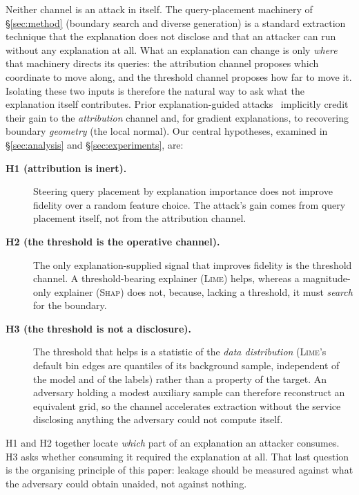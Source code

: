 \documentclass[sigconf,anonymous,review]{acmart}
\begin{document}
Neither channel is an attack in itself. The query-placement machinery of \S\ref{sec:method} (boundary search and diverse generation) is a standard extraction technique that the explanation does not
disclose and that an attacker can run without any explanation at all. What an explanation can change is
only \emph{where} that machinery directs its queries: the attribution channel proposes which coordinate
to move along, and the threshold channel proposes how far to move it. Isolating these two inputs is
therefore the natural way to ask what the explanation itself contributes. Prior explanation-guided
attacks~\cite{oksuz2024autolycus,milli2019model} implicitly credit their gain to the
\emph{attribution} channel and, for gradient explanations, to recovering boundary \emph{geometry} (the
local normal). Our central hypotheses, examined
in \S\ref{sec:analysis} and \S\ref{sec:experiments}, are:
\begin{description}
  \item[\textbf{H1 (attribution is inert).}] Steering query placement by explanation
  importance does not improve fidelity over a random feature choice. The attack's gain
  comes from query placement itself, not from the attribution channel.
  \item[\textbf{H2 (the threshold is the operative channel).}] The only explanation-supplied
  signal that improves fidelity is the threshold channel. A threshold-bearing explainer
  (\textsc{Lime}) helps, whereas a magnitude-only explainer (\textsc{Shap}) does not, because, lacking a threshold, it must \emph{search} for the boundary.
  \item[\textbf{H3 (the threshold is not a disclosure).}] The threshold that helps is a
  statistic of the \emph{data distribution} (\textsc{Lime}'s default bin edges are quantiles of its background sample, independent of the model and of the labels) rather than a
  property of the target. An adversary holding a modest auxiliary sample can therefore
  reconstruct an equivalent grid, so the channel accelerates extraction without the service
  disclosing anything the adversary could not compute itself.
\end{description}
H1 and H2 together locate \emph{which} part of an explanation an attacker consumes. H3 asks whether consuming it required the explanation at all. That last question is the organising
principle of this paper: leakage should be measured against what the adversary could obtain
unaided, not against nothing.
\end{document}
